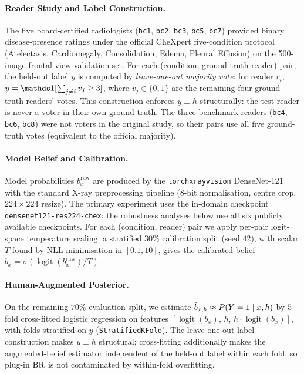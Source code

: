 \paragraph{Reader Study and Label Construction.}
The five board-certified radiologists (\texttt{bc1}, \texttt{bc2}, \texttt{bc3}, \texttt{bc5}, \texttt{bc7}) provided binary disease-presence ratings under the official CheXpert five-condition protocol (Atelectasis, Cardiomegaly, Consolidation, Edema, Pleural Effusion) on the 500-image frontal-view validation set.
For each (condition, ground-truth reader) pair, the held-out label $y$ is computed by \emph{leave-one-out majority vote}: for reader $r_i$, $y = \Ind[\sum_{j \neq i} v_j \geq 3]$, where $v_j \in \{0,1\}$ are the remaining four ground-truth readers' votes.
This construction enforces $y \perp h$ structurally: the test reader is never a voter in their own ground truth.
The three benchmark readers (\texttt{bc4}, \texttt{bc6}, \texttt{bc8}) were not voters in the original study, so their pairs use all five ground-truth votes (equivalent to the official majority).

\paragraph{Model Belief and Calibration.}
Model probabilities $b_x^{\mathrm{raw}}$ are produced by the \texttt{torchxrayvision} DenseNet-121 \citep{Huang2017,Cohen2022} with the standard X-ray preprocessing pipeline (8-bit normalisation, centre crop, $224{\times}224$ resize).
The primary experiment uses the in-domain checkpoint \texttt{densenet121-res224-chex}; the robustness analyses below use all six publicly available checkpoints.
For each (condition, reader) pair we apply per-pair logit-space temperature scaling: a stratified $30\%$ calibration split (seed $42$), with scalar $T$ found by NLL minimisation in $[0.1,10]$, gives the calibrated belief $b_x = \sigma(\operatorname{logit}(b_x^{\mathrm{raw}})/T)$.

\paragraph{Human-Augmented Posterior.}
On the remaining $70\%$ evaluation split, we estimate $\hat{b}_{x,h} \approx P(Y=1\mid x,h)$ by $5$-fold cross-fitted logistic regression on features $[\operatorname{logit}(b_x),\,h,\,h\cdot\operatorname{logit}(b_x)]$, with folds stratified on $y$ (\texttt{StratifiedKFold}).
The leave-one-out label construction makes $y \perp h$ structural; cross-fitting additionally makes the augmented-belief estimator independent of the held-out label within each fold, so plug-in $\operatorname{BR}$ is not contaminated by within-fold overfitting.

